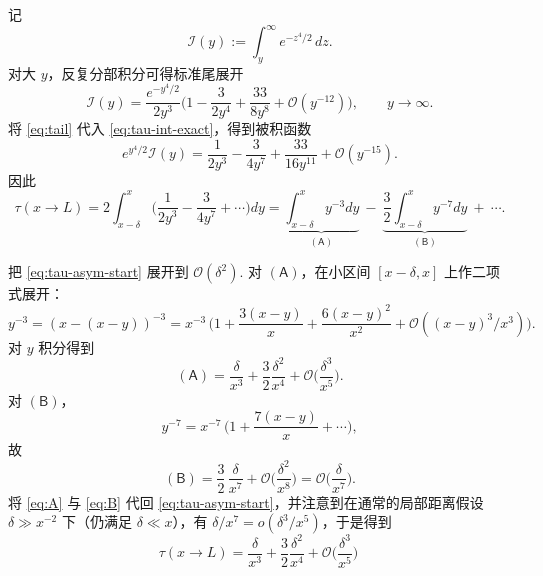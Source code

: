 记
\[
\mathcal I(y):=\int_{y}^{\infty} e^{-z^{4}/2}\,dz.
\]
对大 $y$，反复分部积分可得标准尾展开
\begin{equation}\label{eq:tail}
	\mathcal I(y)=\frac{e^{-y^{4}/2}}{2y^{3}}
	\Big(1-\frac{3}{2y^{4}}+\frac{33}{8y^{8}}+\mathcal O(y^{-12})\Big),\qquad y\to\infty.
\end{equation}
将 \eqref{eq:tail} 代入 \eqref{eq:tau-int-exact}，得到被积函数
\begin{equation}\label{eq:F-expansion}
	e^{y^{4}/2}\mathcal I(y)
	=\frac{1}{2y^{3}}-\frac{3}{4y^{7}}+\frac{33}{16y^{11}}+\mathcal O(y^{-15}).
\end{equation}
因此
\begin{equation}\label{eq:tau-asym-start}
	\tau(x\to L)
	=2\!\int_{x-\delta}^{x}\!\!\Big(\frac{1}{2y^{3}}-\frac{3}{4y^{7}}+\cdots\Big)dy
	=\underbrace{\int_{x-\delta}^{x}\!y^{-3}dy}_{\mathsf{(A)}}
	\ -\ \underbrace{\frac{3}{2}\int_{x-\delta}^{x}\!y^{-7}dy}_{\mathsf{(B)}}
	\ +\ \cdots.
\end{equation}

把 \eqref{eq:tau-asym-start} 展开到 $\mathcal O(\delta^{2})$.	对 $\mathsf{(A)}$，在小区间 \([x-\delta,x]\) 上作二项式展开：
\[
y^{-3}=(x-(x-y))^{-3}
=x^{-3}\,\Big(1+\frac{3(x-y)}{x}+\frac{6(x-y)^{2}}{x^{2}}+\mathcal O((x-y)^{3}/x^{3})\Big).
\]
对 $y$ 积分得到
\begin{equation}\label{eq:A}
	\mathsf{(A)}
	=\frac{\delta}{x^{3}}+\frac{3}{2}\frac{\delta^{2}}{x^{4}}
	+\mathcal O\!\Big(\frac{\delta^{3}}{x^{5}}\Big).
\end{equation}
对 $\mathsf{(B)}$，
\[
y^{-7}=x^{-7}\,\Big(1+\frac{7(x-y)}{x}+\cdots\Big),
\]
故
\begin{equation}\label{eq:B}
	\mathsf{(B)}=\frac{3}{2}\,\frac{\delta}{x^{7}}
	+\mathcal O\!\Big(\frac{\delta^{2}}{x^{8}}\Big)
	=\mathcal O\!\Big(\frac{\delta}{x^{7}}\Big).
\end{equation}
将 \eqref{eq:A} 与 \eqref{eq:B} 代回 \eqref{eq:tau-asym-start}，并注意到在通常的局部距离假设
\(
\delta\gg x^{-2}
\)
下（仍满足 $\delta\ll x$），有
\(
\delta/x^{7}=o(\delta^{3}/x^{5})
\)，于是得到
\begin{equation}\label{eq:tau-final-asym}
	\tau(x\to L)=\frac{\delta}{x^{3}}
	+\frac{3}{2}\frac{\delta^{2}}{x^{4}}
	+\mathcal O\!\Big(\frac{\delta^{3}}{x^{5}}\Big)\ 
\end{equation}

